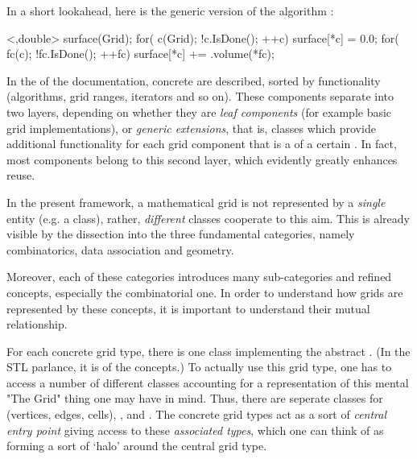  In a short lookahead, here is the generic version of the 
 algorithm  :

 \begin{example}
<,double> surface(Grid);
for( c(Grid); !c.IsDone(); ++c) {
  surface[*c] = 0.0; 
  for( fc(c); !fc.IsDone(); ++fc)
    surface[*c] += .volume(*fc);
}
 \end{example}

 In the  of the documentation,
 concrete 
 are described, sorted by functionality 
 (algorithms, grid ranges, iterators and so on).
 These components separate into two layers, 
 depending on whether they are  \emph{leaf components\/}
 (for example basic grid implementations),
 or \emph{generic extensions}, that is, 
 classes which provide additional functionality 
 for each grid component that is a  of a certain .
 In fact, most components belong to this second layer,
 which evidently greatly enhances reuse.
  
  \bigsep 

  In the present framework, a mathematical grid is not represented by a {\em single\/}
  entity (e.g. a class), 
  rather, {\em different\/} classes cooperate to this aim.
  This is already visible by the dissection into the three fundamental categories,
  namely combinatorics, data association and geometry.
  
  Moreover, each of these categories introduces many sub-categories 
  and refined concepts, 
  especially the combinatorial one.
  In order to understand how grids are represented by these concepts,
  it is important to understand their mutual relationship.

  For each concrete grid type, there is one class implementing
  the abstract .
  {\small (In the STL parlance, it is  of the concepts.)}
  To actually use this grid type, one has to access a number of
  different classes accounting for a representation 
  of this mental "The Grid" thing one may have in mind.
  Thus, there are seperate classes for 
   (vertices, edges, cells),
  , 
  and .
  The concrete grid types act as a sort of {\em central entry point\/} 
  giving access to these {\sl associated types\/},
  which one can think of  as  forming a sort of `halo'
  around the central grid type.

